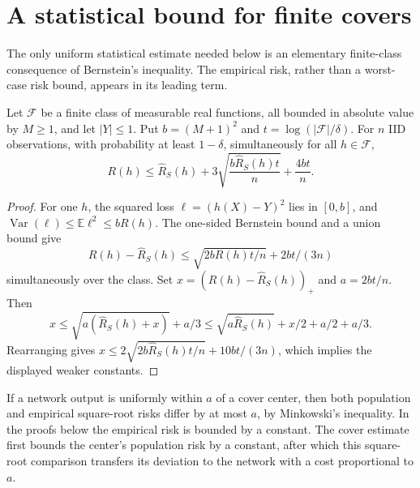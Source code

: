 \section{A statistical bound for finite covers}
\label{sec:finite-cover-statistics}

The only uniform statistical estimate needed below is an elementary
finite-class consequence of Bernstein's inequality. The empirical
risk, rather than a worst-case risk bound, appears in its leading term.

\begin{lemma}
\label{lem:finite-cover-bernstein}
Let $\mathcal F$ be a finite class of measurable real functions, all
bounded in absolute value by $M\geq1$, and let $|Y|\leq1$.
Put $b=(M+1)^2$ and $t=\log(|\mathcal F|/\delta)$.
For $n$ IID observations, with probability at least $1-\delta$,
simultaneously for all $h\in\mathcal F$,
\begin{equation}
 R(h)\leq\widehat R_S(h)
       +3\sqrt{\frac{b\widehat R_S(h)t}{n}}
       +\frac{4bt}{n}.
 \label{eq:finite-cover-bernstein}
\end{equation}
\end{lemma}
\begin{proof}
For one $h$, the squared loss $\ell=(h(X)-Y)^2$ lies in $[0,b]$,
and $\operatorname{Var}(\ell)\leq\mathbb E\ell^2\leq bR(h)$.
The one-sided Bernstein bound and a union bound give
\[
 R(h)-\widehat R_S(h)
 \leq\sqrt{2bR(h)t/n}+2bt/(3n)
\]
simultaneously over the class. Set
$x=(R(h)-\widehat R_S(h))_+$ and $a=2bt/n$.
Then
\[
 x\leq\sqrt{a(\widehat R_S(h)+x)}+a/3
 \leq\sqrt{a\widehat R_S(h)}+x/2+a/2+a/3.
\]
Rearranging gives
$x\leq2\sqrt{2b\widehat R_S(h)t/n}+10bt/(3n)$,
which implies the displayed weaker constants.
\end{proof}

If a network output is uniformly within $a$ of a cover center, then
both population and empirical square-root risks differ by at most $a$,
by Minkowski's inequality. In the proofs below the empirical risk is
bounded by a constant. The cover estimate first bounds the center's
population risk by a constant, after which this square-root comparison
transfers its deviation to the network with a cost proportional to $a$.
